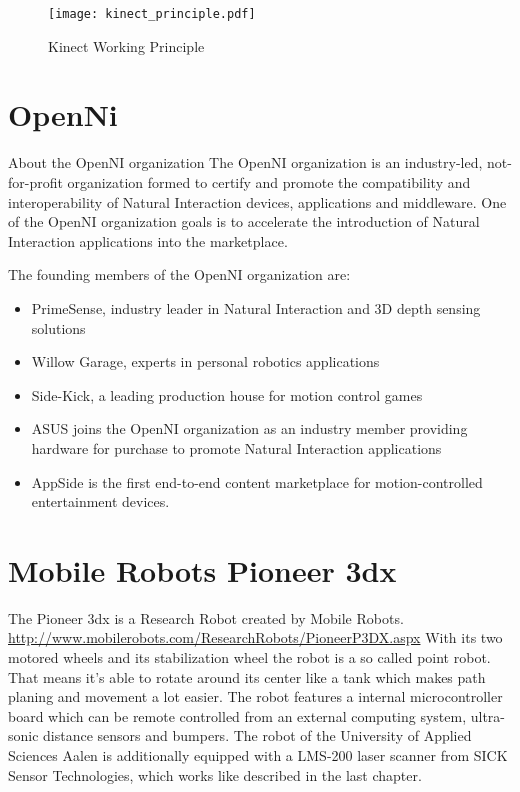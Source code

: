 \begin{figure}[htp]
	\centering
	\texttt{[image: kinect\_principle.pdf]}
	\caption{Kinect Working Principle}
	\label{figure:kinect_WP} 
\end{figure}
\clearpage

\section{OpenNi}

About the OpenNI organization
The OpenNI organization is an industry-led, not-for-profit organization formed to certify and 
promote the compatibility and interoperability of Natural Interaction devices, applications and middleware. 
One of the OpenNI organization goals is to accelerate the introduction of Natural Interaction applications into 
the marketplace.

The founding members of the OpenNI organization are:
\begin{itemize}
  \item PrimeSense, industry leader in Natural Interaction and 3D depth sensing solutions   
  \item Willow Garage, experts in personal robotics applications  
  \item Side-Kick, a leading production house for motion control games  
  \item ASUS joins the OpenNI organization as an industry member providing hardware for purchase to promote Natural Interaction applications
  \item AppSide is the first end-to-end content marketplace for motion-controlled entertainment devices. 
\end{itemize}
\cite{openni:about} 

\section{Mobile Robots Pioneer 3dx}
The Pioneer 3dx is a Research Robot created by Mobile Robots.\\
\url{http://www.mobilerobots.com/ResearchRobots/PioneerP3DX.aspx}
With its two motored wheels and its stabilization wheel the robot is a so called point robot. That means it's able to 
rotate around its center like a tank which makes path planing and movement a lot easier. 
The robot features a internal microcontroller board which can be remote controlled from an external computing system, 
ultra-sonic distance sensors and bumpers. The robot of the University of Applied Sciences Aalen 
is additionally equipped with a LMS-200 laser scanner from SICK Sensor Technologies, which works
like described in the last chapter.







 

 
